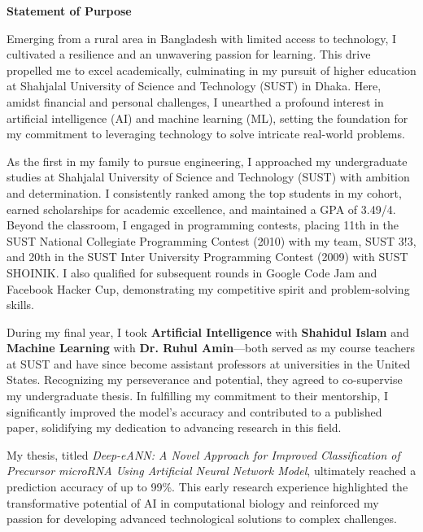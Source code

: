 \documentclass[11pt]{article}
\begin{document}
\begin{center}
    {\Large \textbf{Statement of Purpose}}
\end{center}

\ifshowsections{}\fi
\firstparagraph Emerging from a rural area in Bangladesh with limited access to technology, I cultivated a resilience
and an unwavering passion for learning. This drive propelled me to excel academically, culminating
in my pursuit of higher education at Shahjalal University of Science and Technology (SUST) in Dhaka.
Here, amidst financial and personal challenges, I unearthed a profound interest in artificial intelligence
(AI) and machine learning (ML), setting the foundation for my commitment to leveraging technology to solve
intricate real-world problems.

\ifshowsections{}\fi
\firstparagraph As the first in my family to pursue engineering, I approached my undergraduate studies at Shahjalal University
of Science and Technology (SUST) with ambition and determination. I consistently ranked among the top students
in my cohort, earned scholarships for academic excellence, and maintained a GPA of 3.49/4. Beyond the classroom,
I engaged in programming contests, placing 11th in the SUST National Collegiate Programming Contest (2010) with
my team, SUST 3!3, and 20th in the SUST Inter University Programming Contest (2009) with SUST SHOINIK. I also
qualified for subsequent rounds in Google Code Jam and Facebook Hacker Cup, demonstrating my competitive spirit
and problem-solving skills.

During my final year, I took \textbf{Artificial Intelligence} with \textbf{Shahidul Islam} and \textbf{Machine
Learning} with \textbf{Dr. Ruhul Amin}—both served as my course teachers at SUST and have since become assistant
professors at universities in the United States. Recognizing my perseverance and potential, they agreed to
co-supervise my undergraduate thesis. In fulfilling my commitment to their mentorship, I significantly improved
the model’s accuracy and contributed to a published paper, solidifying my dedication to advancing research
in this field.

My thesis, titled \textit{Deep-eANN: A Novel Approach for Improved Classification of Precursor microRNA Using
Artificial Neural Network Model}, ultimately reached a prediction accuracy of up to 99\%. This early research
experience highlighted the transformative potential of AI in computational biology and reinforced my passion for
developing advanced technological solutions to complex challenges.
\end{document}
